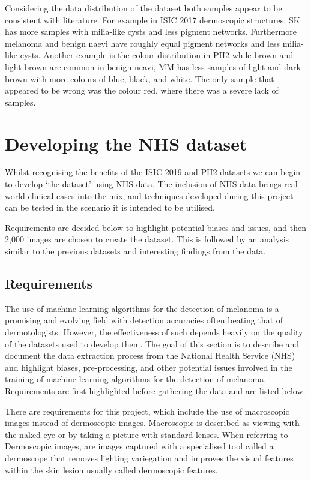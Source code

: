 Considering the data distribution of the dataset both samples appear to be consistent with literature. For example in ISIC 2017 dermoscopic structures, SK has more samples with milia-like cysts and less pigment networks. Furthermore melanoma and benign naevi have roughly equal pigment networks and less milia-like cysts. Another example is the colour distribution in PH2 while brown and light brown are common in benign neavi, MM has less samples of light and dark brown with more colours of blue, black, and white. The only sample that appeared to be wrong was the colour red, where there was a severe lack of samples.

\section{Developing the NHS dataset}
Whilst recognising the benefits of the ISIC 2019 and PH2 datasets we can begin to develop `the dataset' using NHS data. The inclusion of NHS data brings real-world clinical cases into the mix, and techniques developed during this project can be tested in the scenario it is intended to be utilised.

Requirements are decided below to highlight potential biases and issues, and then 2,000 images are chosen to create the dataset. This is followed by an analysis similar to the previous datasets and interesting findings from the data.

\subsection{Requirements}
The use of machine learning algorithms for the detection of melanoma is a promising and evolving field with detection accuracies often beating that of dermotologists\cite{Andre2017}. However, the effectiveness of such depends heavily on the quality of the datasets used to develop them\cite{Tae2019}. The goal of this section is to describe and document the data extraction process from the National Health Service (NHS) and highlight biases, pre-processing, and other potential issues involved in the training of machine learning algorithms for the detection of melanoma. Requirements are first highlighted before gathering the data and are listed below.

There are requirements for this project, which include the use of macroscopic images instead of dermoscopic images. Macroscopic is described as viewing with the naked eye or by taking a picture with standard lenses. When referring to Dermoscopic images, are images captured with a specialised tool called a dermoscope that removes lighting variegation and improves the visual features within the skin lesion usually called dermoscopic features.

